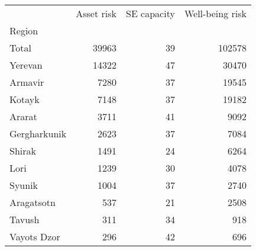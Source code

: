 \begin{tabular}{lrrr}
\toprule
{} &  Asset risk &  SE capacity &  Well-being risk \\
Region       &             &              &                  \\
\midrule
Total        &       39963 &           39 &           102578 \\
Yerevan      &       14322 &           47 &            30470 \\
Armavir      &        7280 &           37 &            19545 \\
Kotayk       &        7148 &           37 &            19182 \\
Ararat       &        3711 &           41 &             9092 \\
Gergharkunik &        2623 &           37 &             7084 \\
Shirak       &        1491 &           24 &             6264 \\
Lori         &        1239 &           30 &             4078 \\
Syunik       &        1004 &           37 &             2740 \\
Aragatsotn   &         537 &           21 &             2508 \\
Tavush       &         311 &           34 &              918 \\
Vayots Dzor  &         296 &           42 &              696 \\
\bottomrule
\end{tabular}
